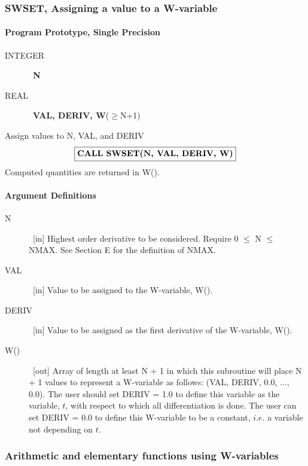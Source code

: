 \documentclass[twoside]{MATH77}
\begin{document}
\subsubsection{SWSET, Assigning a value to a W-variable\label{B1}}

\paragraph{Program Prototype, Single Precision}

\begin{description}
\item[INTEGER]  \ {\bf N}

\item[REAL]  \ {\bf VAL, DERIV, W}($\geq $N+1)
\end{description}

Assign values to N, VAL, and DERIV
$$
\fbox{{\bf CALL SWSET(N, VAL, DERIV, W)}}
$$
Computed quantities are returned in W().

\paragraph{Argument Definitions}

\begin{description}
\item[N]  \ [in] Highest order derivative to be considered. Require 0 $\leq $
N $\leq $ NMAX. See Section E for the definition of NMAX.

\item[VAL]  \ [in] Value to be assigned to the W-variable, W().

\item[DERIV]  \ [in] Value to be assigned as the first derivative of the
W-variable, W().

\item[W()]  \ [out] Array of length at least N + 1 in which this subroutine
will place N + 1 values to represent a W-variable as follows: (VAL, DERIV,
0.0, ..., 0.0). The user should set DERIV = 1.0 to define this variable as
the variable, $t$, with respect to which all differentiation is done. The
user can set DERIV = 0.0 to define this W-variable to be a constant, $i.e$.
a variable not depending on $t.$
\end{description}

\subsubsection{Arithmetic and elementary functions using W-variables\label{B2}}
\end{document}
